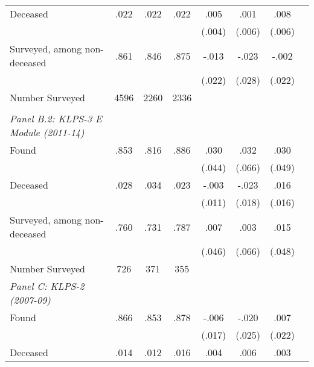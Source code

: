 \begin{tabular}{l*{7}{c}}
Deceased            &        .022&        .022&        .022&        .005         &        .001         &        .008         \\
                    &            &            &            &      (.004)         &      (.006)         &      (.006)         \\
Surveyed, among non-deceased&        .861&        .846&        .875&       -.013         &       -.023         &       -.002         \\
                    &            &            &            &      (.022)         &      (.028)         &      (.022)         \\
Number Surveyed     &        4596&        2260&        2336&                     &                     &                     \\
& & & & & & \\ \emph{Panel B.2: KLPS-3 E Module (2011-14)} & & & & & & \\ Found&        .853&        .816&        .886&        .030         &        .032         &        .030         \\
                    &            &            &            &      (.044)         &      (.066)         &      (.049)         \\
Deceased            &        .028&        .034&        .023&       -.003         &       -.023         &        .016         \\
                    &            &            &            &      (.011)         &      (.018)         &      (.016)         \\
Surveyed, among non-deceased&        .760&        .731&        .787&        .007         &        .003         &        .015         \\
                    &            &            &            &      (.046)         &      (.066)         &      (.048)         \\
Number Surveyed     &         726&         371&         355&                     &                     &                     \\
\midrule
\emph{Panel C: KLPS-2 (2007-09)} & & & & & & \\ Found&        .866&        .853&        .878&       -.006         &       -.020         &        .007         \\
                    &            &            &            &      (.017)         &      (.025)         &      (.022)         \\
Deceased            &        .014&        .012&        .016&        .004         &        .006         &        .003         \\

\end{tabular}
